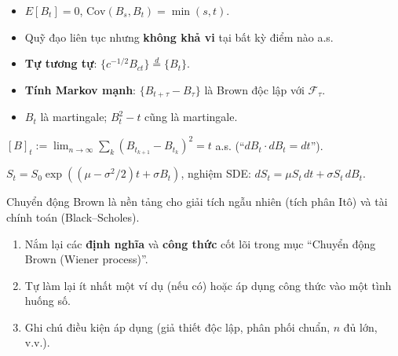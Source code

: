 \documentclass[12pt,a4paper]{article}
\begin{document}
\begin{tinhchat}
  \begin{itemize}
    \item $E[B_t] = 0$, $\text{Cov}(B_s, B_t) = \min(s, t)$.
    \item Quỹ đạo liên tục nhưng \textbf{không khả vi} tại bất kỳ điểm nào a.s.
    \item \textbf{Tự tương tự}: $\{c^{-1/2}B_{ct}\} \overset{d}{=} \{B_t\}$.
    \item \textbf{Tính Markov mạnh}: $\{B_{t+\tau} - B_\tau\}$ là Brown độc lập với $\mathcal{F}_\tau$.
    \item $B_t$ là martingale; $B_t^2 - t$ cũng là martingale.
  \end{itemize}
\end{tinhchat}

\begin{dinhly}[title={Biến phân bậc hai}]
  $[B]_t := \lim_{n \to \infty} \sum_{k} (B_{t_{k+1}} - B_{t_k})^2 = t$ a.s. (``$dB_t \cdot dB_t = dt$'').
\end{dinhly}

\begin{dinhnghia}[title={Chuyển động Brown hình học}]
  $S_t = S_0 \exp\!\left((\mu - \sigma^2/2)t + \sigma B_t\right)$, nghiệm SDE: $dS_t = \mu S_t\,dt + \sigma S_t\,dB_t$.
\end{dinhnghia}

\begin{luuy}
  Chuyển động Brown là nền tảng cho giải tích ngẫu nhiên (tích phân Itô) và tài chính toán (Black--Scholes).
\end{luuy}

\begin{tongket}[title={Tổng kết: Chuyển động Brown (Wiener process)}]
\begin{enumerate}
  \item Nắm lại các \textbf{định nghĩa} và \textbf{công thức} cốt lõi trong mục ``Chuyển động Brown (Wiener process)''.
  \item Tự làm lại ít nhất một ví dụ (nếu có) hoặc áp dụng công thức vào một tình huống số.
  \item Ghi chú điều kiện áp dụng (giả thiết độc lập, phân phối chuẩn, $n$ đủ lớn, v.v.).
\end{enumerate}
\end{tongket}
\end{document}
